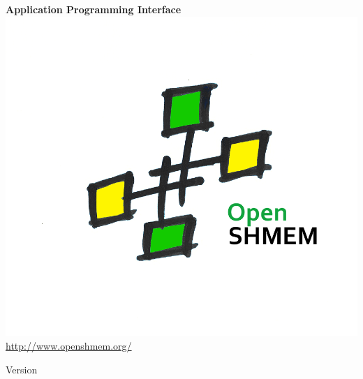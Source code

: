 \thispagestyle{empty}

\begin{center}
\textbf{\Huge \openshmem}
\par
\end{center}

\begin{center}
\textbf{\LARGE Application Programming Interface}\\
\includegraphics[scale=0.65]{OpenSHMEM_Pound}\\
\url{http://www.openshmem.org/}
\par
\end{center}

\begin{center}
Version \insertDocVersion
\par
\end{center}

\vspace{0.5in}



